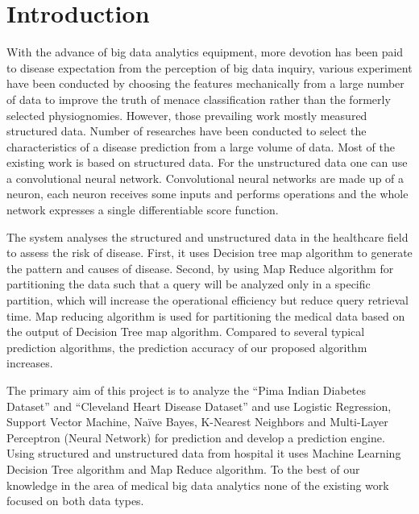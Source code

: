 \documentclass{book}
\author{akshat}
\date{2020}
\begin{document}
	

    \chapter{Introduction}
    \setcounter{page}{1}
    
    \begin{doublespace}
    With the advance of big data analytics equipment, more devotion has been paid to disease expectation from the perception of big data inquiry, various experiment have been conducted by choosing the features mechanically from a large number of data to improve the truth of menace classification rather than the formerly selected physiognomies. However, those prevailing work mostly measured structured data. Number of researches have been conducted to select the characteristics of a disease prediction from a large volume of data. Most of the existing work is based on  structured data. For the unstructured data one can use a convolutional neural network. Convolutional neural networks are made up of a neuron, each neuron receives some inputs and performs operations and the whole network expresses a single differentiable score function.
    
    The system analyses the structured and unstructured data in the healthcare field to assess the risk of disease. First, it uses Decision tree map algorithm to generate the pattern and causes of disease. Second, by using Map Reduce algorithm for partitioning the data such that a query will be analyzed only in a specific partition, which will increase the operational efficiency but reduce query retrieval time. Map reducing algorithm is used for partitioning the medical data based on the output of Decision Tree map algorithm. Compared to several typical prediction algorithms, the prediction accuracy of our proposed algorithm increases.
    
    The primary aim of this project is to analyze the “Pima Indian Diabetes Dataset” and “Cleveland Heart Disease Dataset” and use Logistic Regression, Support Vector Machine, Naïve Bayes, K-Nearest Neighbors and Multi-Layer Perceptron (Neural Network) for prediction and develop a prediction engine. Using structured and unstructured data from hospital it uses Machine Learning Decision Tree algorithm and Map Reduce algorithm. To the best of our knowledge in the area of medical big data analytics none of the existing work focused on both data types.
    \end{doublespace}
    	
\end{document}
